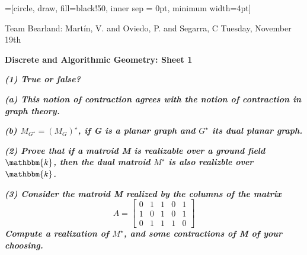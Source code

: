 \documentclass[a4paper, 10pt]{article}
\theoremstyle{definition} %
\begin{document}
=[circle, draw, fill=black!50, inner sep = 0pt, minimum width=4pt]

Team Bearland: Mart\'in, V. and Oviedo, P. and Segarra, C \hfill Tuesday, November 19th

\vspace{15pt}

\textbf{\Large Discrete and Algorithmic Geometry: Sheet 1}

\vspace{20pt}

\textbf{\textit{(1) True or false?}}

\vspace{3pt}

\hspace{5pt} \textbf{\textit{(a) This notion of contraction agrees with the notion of contraction in graph theory.}}

\vspace{3pt}


\begin{figure}[h!]
    \centering
\end{figure}

\hspace{5pt} \textbf{\textit{(b) $M_{G^\star} = \left(M_G\right)^\star$, if G is a planar graph and $G^\star$ its dual planar graph.}}

\vspace{10pt}

\textbf{\textit{(2) Prove that if a matroid M is realizable over a ground field $\mathbbm{k}$, then the dual matroid $M^\star$ is also realizble over $\mathbbm{k}$.}}

\vspace{10pt}

\textbf{\textit{(3) Consider the matroid M realized by the columns of the matrix}}
$$
A = \left[
    \begin{array}{ccccc}
        0 & 1 & 1 & 0 & 1 \\
        1 & 0 & 1 & 0 & 1 \\
        0 & 1 & 1 & 1 & 0
    \end{array}
\right]
$$
\textbf{\textit{ Compute a realization of $M^\star$, and some contractions of M of your choosing.}}

\vspace{5pt}
\end{document}
